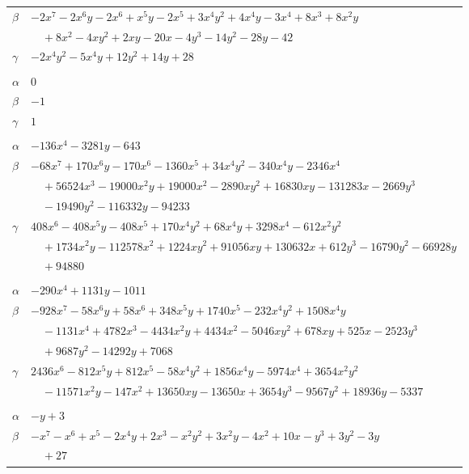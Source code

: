 \documentclass[11pt]{article}
\begin{document}
\begin{longtable}{@{}ll@{}}
$\beta$ & $-2x^{7}-2x^{6}y-2x^{6}+x^{5}y-2x^{5}+3x^{4}y^{2}+4x^{4}y-3x^{4}+8x^{3}+8x^{2}y$\\
 & $\quad +8x^{2}-4xy^{2}+2xy-20x-4y^{3}-14y^{2}-28y-42$\\
$\gamma$ & $-2x^{4}y^{2}-5x^{4}y+12y^{2}+14y+28$\\
\addlinespace[3pt]
\multicolumn{2}{@{}l}{$\{i,j\}=\{11,12\}$, $k_{ij}=2$}\\
$\alpha$ & $0$\\
$\beta$ & $-1$\\
$\gamma$ & $1$\\
\addlinespace[3pt]
\multicolumn{2}{@{}l}{$\{i,j\}=\{12,28\}$, $k_{ij}=2^{2}$}\\
$\alpha$ & $-136x^{4}-3281y-643$\\
$\beta$ & $-68x^{7}+170x^{6}y-170x^{6}-1360x^{5}+34x^{4}y^{2}-340x^{4}y-2346x^{4}$\\
 & $\quad +56524x^{3}-19000x^{2}y+19000x^{2}-2890xy^{2}+16830xy-131283x-2669y^{3}$\\
 & $\quad -19490y^{2}-116332y-94233$\\
$\gamma$ & $408x^{6}-408x^{5}y-408x^{5}+170x^{4}y^{2}+68x^{4}y+3298x^{4}-612x^{2}y^{2}$\\
 & $\quad +1734x^{2}y-112578x^{2}+1224xy^{2}+91056xy+130632x+612y^{3}-16790y^{2}-66928y$\\
 & $\quad +94880$\\
\addlinespace[3pt]
\multicolumn{2}{@{}l}{$\{i,j\}=\{12,36\}$, $k_{ij}=2^{4}\cdot 3^{2}\cdot 5$}\\
$\alpha$ & $-290x^{4}+1131y-1011$\\
$\beta$ & $-928x^{7}-58x^{6}y+58x^{6}+348x^{5}y+1740x^{5}-232x^{4}y^{2}+1508x^{4}y$\\
 & $\quad -1131x^{4}+4782x^{3}-4434x^{2}y+4434x^{2}-5046xy^{2}+678xy+525x-2523y^{3}$\\
 & $\quad +9687y^{2}-14292y+7068$\\
$\gamma$ & $2436x^{6}-812x^{5}y+812x^{5}-58x^{4}y^{2}+1856x^{4}y-5974x^{4}+3654x^{2}y^{2}$\\
 & $\quad -11571x^{2}y-147x^{2}+13650xy-13650x+3654y^{3}-9567y^{2}+18936y-5337$\\
\addlinespace[3pt]
\multicolumn{2}{@{}l}{$\{i,j\}=\{14,24\}$, $k_{ij}=2\cdot 3^{2}$}\\
$\alpha$ & $-y+3$\\
$\beta$ & $-x^{7}-x^{6}+x^{5}-2x^{4}y+2x^{3}-x^{2}y^{2}+3x^{2}y-4x^{2}+10x-y^{3}+3y^{2}-3y$\\
 & $\quad +27$\\

\end{longtable}
\end{document}
